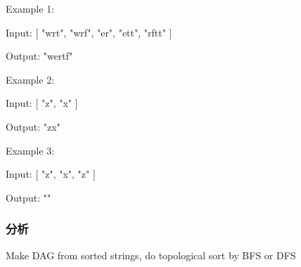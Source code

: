 Example 1:
\begin{Code}
Input:
[
  "wrt",
  "wrf",
  "er",
  "ett",
  "rftt"
]

Output: "wertf"
\end{Code}

Example 2:
\begin{Code}
Input:
[
  "z",
  "x"
]

Output: "zx"
\end{Code}

Example 3:
\begin{Code}
Input:
[
  "z",
  "x",
  "z"
] 

Output: "" 
\end{Code}

\subsubsection{分析}
Make DAG from sorted strings, do topological sort by BFS or DFS


